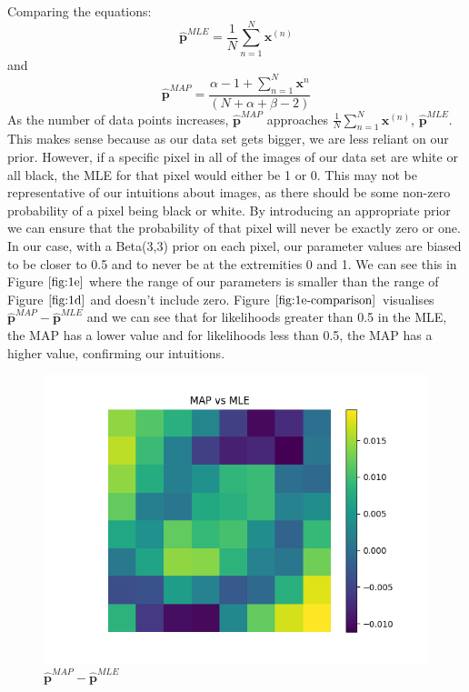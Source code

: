 \documentclass[12pt]{article}
\begin{document}
\begin{enumerate}
Comparing the equations:
    $$\hat{\textbf{p}}^{MLE} = \frac{1}{N}\sum_{n=1}^{N} \textbf{x}^{(n)}$$
    and
    $$\hat{\textbf{p}}^{MAP}  =  \frac{\alpha - 1 +\sum_{n=1}^{N} \textbf{x}^n}{(N+\alpha+\beta-2)}$$
As the number of data points increases, $\hat{\textbf{p}}^{MAP}$ approaches $\frac{1}{N}\sum_{n=1}^{N} \textbf{x}^{(n)}$, $\hat{\textbf{p}}^{MLE}$.
This makes sense because as our data set gets bigger, we are less reliant on our prior.
However, if a specific pixel in all of the images of our data set are white or all black, the MLE for that pixel would either be 1 or 0.
This may not be representative of our intuitions about images, as there should be some non-zero probability of a pixel being black or white.
By introducing an appropriate prior we can ensure that the probability of that pixel will never be exactly zero or one.
In our case, with a Beta(3,3) prior on each pixel, our parameter values are biased to be closer to 0.5 and to never be at the extremities 0 and 1.
We can see this in Figure $\ref{fig:1e}$ where the range of our parameters is smaller than the range of Figure $\ref{fig:1d}$ and doesn't include zero.
Figure $\ref{fig:1e-comparison}$ visualises $\hat{\textbf{p}}^{MAP}-\hat{\textbf{p}}^{MLE}$ and we can see that for likelihoods greater than 0.5 in the MLE, the MAP has a lower value and for likelihoods less than 0.5, the MAP has a higher value, confirming our intuitions.

  \begin{figure}[h]
  \centering
  \includegraphics[scale=0.4]{outputs/q1/q1e-mle-vs-map}
  \caption{$\hat{\textbf{p}}^{MAP}-\hat{\textbf{p}}^{MLE}$}
  \label{fig:1e-comparison}
  \end{figure}


\end{enumerate}
\end{document}
